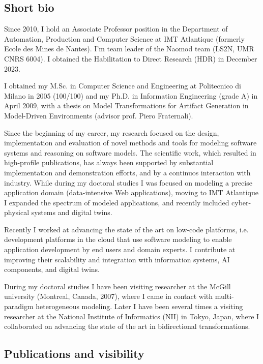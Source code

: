
\subsection*{Short bio}

Since 2010, I hold an Associate Professor position in the Department of Automation, Production and Computer Science at IMT Atlantique (formerly Ecole des Mines de Nantes). I’m team leader of the Naomod team (LS2N, UMR CNRS 6004). I obtained the Habilitation to Direct Research (HDR) in December 2023.

I obtained my M.Sc. in Computer Science and Engineering at Politecnico di Milano in 2005 (100/100) and my Ph.D. in Information Engineering (grade A) in April 2009, with a thesis on Model Transformations for Artifact Generation in Model-Driven Environments (advisor prof. Piero Fraternali).

Since the beginning of my career, my research focused on the design, implementation and evaluation of novel methods and tools for modeling software systems and reasoning on software models. The scientific work, which resulted in high-profile publications, has always been supported by substantial implementation and demonstration efforts, and by a continuos interaction with industry. While during my doctoral studies I was focused on modeling a precise application domain (data-intensive Web applications), moving to IMT Atlantique I expanded the spectrum of modeled applications, and recently included cyber-physical systems and digital twins. 

Recently I worked at advancing the state of the art on low-code platforms, i.e. development platforms in the cloud that use software modeling to enable application development by end users and domain experts. I contribute at improving their scalability and integration with information systems, AI components, and digital twins. 

During my doctoral studies I have been visiting researcher at the McGill university (Montreal, Canada, 2007), where I came in contact with multi-paradigm heterogeneous modeling. Later I have been several times a visiting researcher at the National Institute of Informatics (NII) in Tokyo, Japan, where I collaborated on advancing the state of the art in bidirectional transformations.

\subsection*{Publications and visibility}

